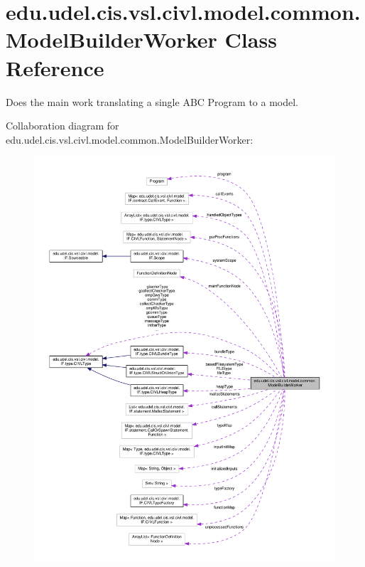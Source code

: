 \hypertarget{classedu_1_1udel_1_1cis_1_1vsl_1_1civl_1_1model_1_1common_1_1ModelBuilderWorker}{}\section{edu.\+udel.\+cis.\+vsl.\+civl.\+model.\+common.\+Model\+Builder\+Worker Class Reference}
\label{classedu_1_1udel_1_1cis_1_1vsl_1_1civl_1_1model_1_1common_1_1ModelBuilderWorker}


Does the main work translating a single A\+B\+C Program to a model.  




Collaboration diagram for edu.\+udel.\+cis.\+vsl.\+civl.\+model.\+common.\+Model\+Builder\+Worker\+:
\nopagebreak
\begin{figure}[H]
\begin{center}
\leavevmode
\includegraphics[width=350pt]{classedu_1_1udel_1_1cis_1_1vsl_1_1civl_1_1model_1_1common_1_1ModelBuilderWorker__coll__graph}
\end{center}
\end{figure}
